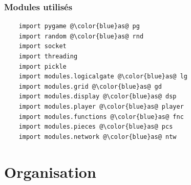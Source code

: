 \documentclass[a4paper]{report}
\begin{document}
\section{Modules utilisés}
\begin{lstlisting}
    import pygame @\color{blue}as@ pg
    import random @\color{blue}as@ rnd
    import socket
    import threading
    import pickle
    import modules.logicalgate @\color{blue}as@ lg
    import modules.grid @\color{blue}as@ gd
    import modules.display @\color{blue}as@ dsp
    import modules.player @\color{blue}as@ player
    import modules.functions @\color{blue}as@ fnc
    import modules.pieces @\color{blue}as@ pcs
    import modules.network @\color{blue}as@ ntw
\end{lstlisting}

\part{Organisation}
\end{document}
